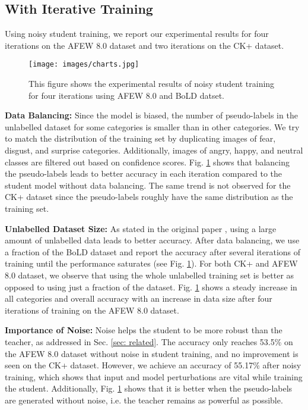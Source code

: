 \documentclass[runningheads]{llncs}
\begin{document}
\subsection{With Iterative Training} \label{with_iterative}
Using noisy student training, we report our experimental results for four iterations on the AFEW 8.0 dataset and two iterations on the CK+ dataset.

\begin{figure}[t!]
\centering
\texttt{[image: images/charts.jpg]}
\caption{This figure shows the experimental results of noisy student training for four iterations using AFEW 8.0 and BoLD datset.}
\label{fig:charts}
\end{figure}

\noindent\textbf{{Data Balancing:}}
Since the model is biased, the number of pseudo-labels in the unlabelled dataset for some categories is smaller than in other categories. We try to match the distribution of the training set by duplicating images of fear, disgust, and surprise categories. Additionally, images of angry, happy, and neutral classes are filtered out based on confidence scores. Fig. \ref{fig:charts} shows that balancing the pseudo-labels leads to better accuracy in each iteration compared to the student model without data balancing. The same trend is not observed for the CK+ dataset since the pseudo-labels roughly have the same distribution as the training set.

\noindent\textbf{{Unlabelled Dataset Size:}}
As stated in the original paper \cite{xie2019self}, using a large amount of unlabelled data leads to better accuracy. After data balancing, we use a fraction of the BoLD dataset and report the accuracy after several iterations of training until the performance saturates (see Fig. \ref{fig:charts}). For both CK+ and AFEW 8.0 dataset, we observe that using the whole unlabelled training set is better as opposed to using just a fraction of the dataset. Fig. \ref{fig:charts} shows a steady increase in all categories and overall accuracy with an increase in data size after four iterations of training on the AFEW 8.0 dataset.


\noindent\textbf{{Importance of Noise:}}
Noise helps the student to be more robust than the teacher, as addressed in Sec. \ref{sec: related}. The accuracy only reaches 53.5\% on the AFEW 8.0 dataset without noise in student training, and no improvement is seen on the CK+ dataset. However, we achieve an accuracy of 55.17\% after noisy training, which shows that input and model perturbations are vital while training the student. Additionally, Fig. \ref{fig:charts} shows that it is better when the pseudo-labels are generated without noise, i.e. the teacher remains as powerful as possible.
\end{document}
